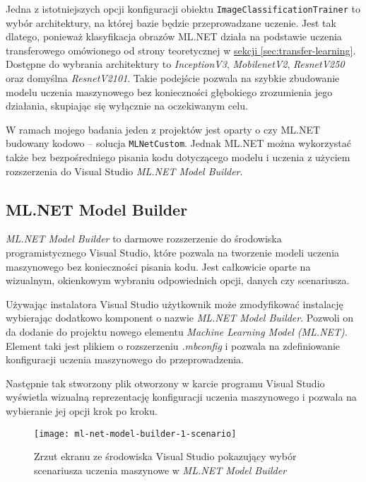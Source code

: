 Jedna z istotniejszych opcji konfiguracji obiektu \lstinline{ImageClassificationTrainer} to wybór architektury, na której bazie będzie przeprowadzane uczenie.
Jest tak dlatego, ponieważ klasyfikacja obrazów ML.NET działa na podstawie uczenia transferowego omówionego od strony teoretycznej w \hyperref[sec:transfer-learning]{sekcji \ref*{sec:transfer-learning}}.
Dostępne do wybrania architektury to \emph{InceptionV3}, \emph{MobilenetV2}, \emph{ResnetV250} oraz domyślna \emph{ResnetV2101}.
Takie podejście pozwala na szybkie zbudowanie modelu uczenia maszynowego bez konieczności głębokiego zrozumienia jego działania, skupiając się wyłącznie na oczekiwanym celu.

W ramach mojego badania jeden z projektów jest oparty o czy ML.NET budowany kodowo -- solucja \lstinline{MLNetCustom}.
Jednak ML.NET można wykorzystać także bez bezpośredniego pisania kodu dotyczącego modelu i uczenia z użyciem rozszerzenia do Visual Studio \emph{ML.NET Model Builder}.

\subsection{ML.NET Model Builder}
\label{sec:ml-net-model-builder}

\emph{ML.NET Model Builder} to darmowe rozszerzenie do środowiska programistycznego Visual Studio, które pozwala na tworzenie modeli uczenia maszynowego bez konieczności pisania kodu.
Jest całkowicie oparte na wizualnym, okienkowym wybraniu odpowiednich opcji, danych czy scenariusza.

Używając instalatora Visual Studio użytkownik może zmodyfikować instalację wybierając dodatkowo komponent o nazwie \emph{ML.NET Model Builder}.
Pozwoli on da dodanie do projektu nowego elementu \emph{Machine Learning Model (ML.NET)}.
Element taki jest plikiem o rozszerzeniu \emph{.mbconfig} i pozwala na zdefiniowanie konfiguracji uczenia maszynowego do przeprowadzenia.

Następnie tak stworzony plik otworzony w karcie programu Visual Studio wyświetla wizualną reprezentację konfiguracji uczenia maszynowego i pozwala na wybieranie jej opcji krok po kroku.

\begin{figure}[ht]
  \texttt{[image: ml-net-model-builder-1-scenario]}
  \caption{Zrzut ekranu ze środowiska Visual Studio pokazujący wybór scenariusza uczenia maszynowe w \emph{ML.NET Model Builder}}
  \label{fig:ml-net-model-builder-1-scenario}
\end{figure}

